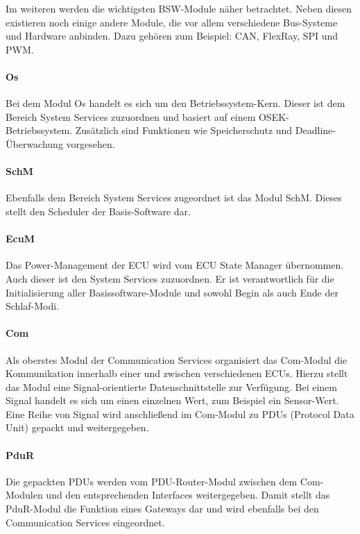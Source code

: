 \documentclass[
  a4paper,					    %
  twoside,
  DIV=calc,     				%
  bibliography=totoc,
  cleardoublepage=empty,
  ngerman,     					%
  final       					%
]{scrbook}
\begin{document}

Im weiteren werden die wichtigsten BSW-Module näher betrachtet\cite{SE_Autosar}. Neben diesen existieren noch einige andere Module, die vor allem verschiedene Bus-Systeme und Hardware anbinden. Dazu gehören zum Beispiel: CAN, FlexRay, SPI und PWM.

\paragraph{Os}
Bei dem Modul Os handelt es sich um den Betriebssystem-Kern. Dieser ist dem Bereich System Services zuzuordnen und basiert auf einem OSEK-Betriebssystem. Zusätzlich sind Funktionen wie Speicherschutz und Deadline-Überwachung vorgesehen.

\paragraph{SchM}
Ebenfalls dem Bereich System Services zugeordnet ist das Modul SchM. Dieses stellt den Scheduler der Basis-Software dar. 

\paragraph{EcuM}
Das Power-Management der ECU wird vom ECU State Manager übernommen. Auch dieser ist den System Services zuzuordnen. Er ist verantwortlich für die Initialisierung aller Basissoftware-Module und sowohl Begin als auch Ende der Schlaf-Modi.

\paragraph{Com}
Als oberstes Modul der Communication Services organisiert das Com-Modul die Kommunikation innerhalb einer und zwischen verschiedenen ECUs. Hierzu stellt das Modul eine Signal-orientierte Datenschnittstelle zur Verfügung. Bei einem Signal handelt es sich um einen einzelnen Wert, zum Beispiel ein Sensor-Wert. Eine Reihe von Signal wird anschließend im Com-Modul zu PDUs (Protocol Data Unit) gepackt und weitergegeben.

\paragraph{PduR}
Die gepackten PDUs werden vom PDU-Router-Modul zwischen dem Com-Modulen und den entsprechenden Interfaces weitergegeben. Damit stellt das PduR-Modul die Funktion eines Gateways dar und wird ebenfalls bei den Communication Services eingeordnet.
\end{document}
